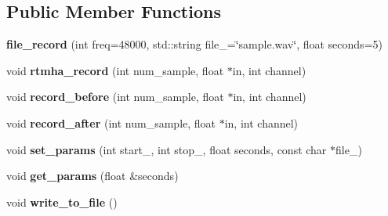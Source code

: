 \subsection*{Public Member Functions}
\begin{DoxyCompactItemize}
\item 
\mbox{\label{classfile__record_aa39004a4aed32436d80b694597b37c47}} 
{\bfseries file\+\_\+record} (int freq=48000, std\+::string file\+\_\+=\char`\"{}sample.\+wav\char`\"{}, float seconds=5)
\item 
\mbox{\label{classfile__record_a8e7f499ae81461bd5a48648ad6aa19c8}} 
void {\bfseries rtmha\+\_\+record} (int num\+\_\+sample, float $\ast$in, int channel)
\item 
\mbox{\label{classfile__record_a9ce4bb8fc603474a050f5c64d423b3f6}} 
void {\bfseries record\+\_\+before} (int num\+\_\+sample, float $\ast$in, int channel)
\item 
\mbox{\label{classfile__record_acf229d7cbf19fd08b62e90ef33ff26c7}} 
void {\bfseries record\+\_\+after} (int num\+\_\+sample, float $\ast$in, int channel)
\item 
\mbox{\label{classfile__record_a39b6f31da58c085a85793f5e77de94bc}} 
void {\bfseries set\+\_\+params} (int start\+\_\+, int stop\+\_\+, float seconds, const char $\ast$file\+\_\+)
\item 
\mbox{\label{classfile__record_ae3d45523d96b17b1b7611daaa493023d}} 
void {\bfseries get\+\_\+params} (float \&seconds)
\item 
\mbox{\label{classfile__record_aab9676316dbd7e767eef34e50d0fe247}} 
void {\bfseries write\+\_\+to\+\_\+file} ()
\end{DoxyCompactItemize}

